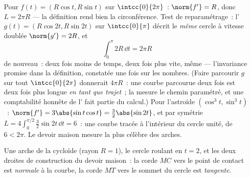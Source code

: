 \begin{example}\label{ex:b1:curves:circlelength}
Pour $f(t) = (R\cos t, R\sin t)$ sur $\intcc{0}{2\pi}$~: $\norm{f'} =
R$, donc $L = 2\pi R$ --- la définition rend bien la circonférence.
Test de reparamétrage~: l' $g(t) = (R\cos 2t, R\sin 2t)$ sur
$\intcc{0}{\pi}$ décrit le \emph{même} cercle à vitesse doublée
$\norm{g'} = 2R$, et
\[
\int_0^{\pi} 2R\,\dd t = 2\pi R
\]
de nouveau~: deux fois moins de temps, deux fois plus vite, même
 --- l'invariance promise dans la définition, constatée une
fois sur les nombres.
(Faire parcourir $g$ sur tout $\intcc{0}{2\pi}$ donnerait $4\pi R$~: une
courbe parcourue deux fois est deux fois plus longue \emph{en tant que
trajet}~; la  mesure le chemin paramétré, et une comptabilité
honnête de l' fait partie du calcul.)
Pour l'astroïde $(\cos^3t, \sin^3t)$~: $\norm{f'} = 3\abs{\sin
t\cos t} = \tfrac32\abs{\sin 2t}$, et par symétrie $L = 4\int_0^{\pi/2}
\tfrac32\sin 2t\,\dd t = 6$~: une courbe tracée à l'intérieur du cercle
unité, de  $6 < 2\pi$. Le devoir maison mesure la plus célèbre
des arches.
\end{example}

\begin{omfigure}

{\small Une arche de la cycloïde (rayon $R = 1$), le cercle roulant
en $t = 2$, et les deux droites de construction du devoir maison~:
la corde $MC$ vers le point de contact est \emph{normale} à la
courbe, la corde $MT$ vers le sommet du cercle est \emph{tangente}.}
\end{omfigure}

